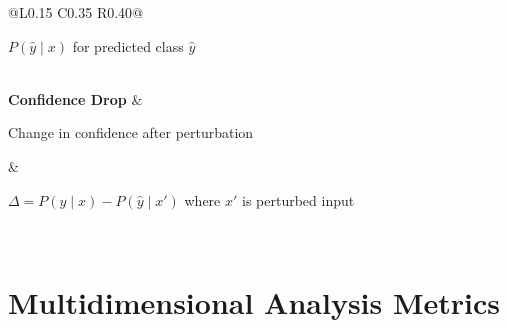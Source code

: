 \documentclass[review,12pt]{elsarticle}
\begin{document}
\begin{table}[H]
\begin{tabular}{@{}L{0.15\textwidth} C{0.35\textwidth} R{0.40\textwidth}@{}}
\begin{minipage}[c]{0.40\textwidth}
\(P(\hat{y} \mid x)\) for predicted class \(\hat{y}\)
\end{minipage}\\[0.4em]
\midrule
\textbf{Confidence Drop} &
\begin{minipage}[c]{0.35\textwidth}\centering
Change in confidence after perturbation
\end{minipage} &
\begin{minipage}[c]{0.40\textwidth}\centering
\(\Delta = P(\hat{y} \mid x) - P(\hat{y} \mid x')\) where \(x'\) is perturbed input
\end{minipage}\\[0.4em]
\bottomrule
\end{tabular}
\end{table}


\clearpage
\section{Multidimensional Analysis Metrics} \label{sec:metrics}
\end{document}
